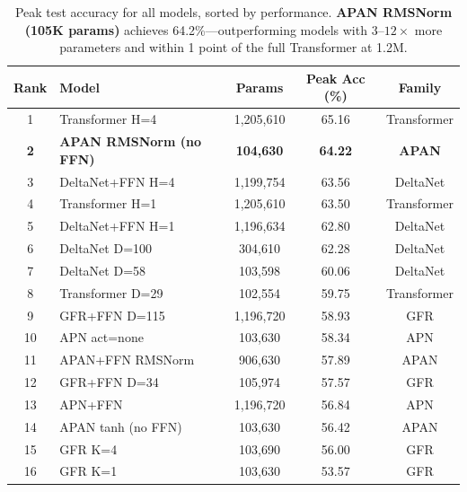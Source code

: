 \documentclass[11pt,a4paper]{article}
\begin{document}
\begin{table}[h]
\centering
\caption{Peak test accuracy for all models, sorted by performance. \textbf{APAN RMSNorm (105K params)} achieves 64.2\%---outperforming models with $3$--$12\times$ more parameters and within 1 point of the full Transformer at 1.2M.}
\label{tab:summary_ranked}
\begin{tabular}{clccc}
\toprule
\textbf{Rank} & \textbf{Model} & \textbf{Params} & \textbf{Peak Acc (\%)} & \textbf{Family} \\
\midrule
1 & Transformer H=4 & 1,205,610 & 65.16 & Transformer \\
\rowcolor{apan-rmsnorm!15}
\textbf{2} & \textbf{APAN RMSNorm (no FFN)} & \textbf{104,630} & \textbf{64.22} & \textbf{APAN} \\
3 & DeltaNet+FFN H=4 & 1,199,754 & 63.56 & DeltaNet \\
4 & Transformer H=1 & 1,205,610 & 63.50 & Transformer \\
5 & DeltaNet+FFN H=1 & 1,196,634 & 62.80 & DeltaNet \\
6 & DeltaNet D=100 & 304,610 & 62.28 & DeltaNet \\
7 & DeltaNet D=58 & 103,598 & 60.06 & DeltaNet \\
8 & Transformer D=29 & 102,554 & 59.75 & Transformer \\
9 & GFR+FFN D=115 & 1,196,720 & 58.93 & GFR \\
10 & APN act=none & 103,630 & 58.34 & APN \\
11 & APAN+FFN RMSNorm & 906,630 & 57.89 & APAN \\
12 & GFR+FFN D=34 & 105,974 & 57.57 & GFR \\
13 & APN+FFN & 1,196,720 & 56.84 & APN \\
14 & APAN tanh (no FFN) & 103,630 & 56.42 & APAN \\
15 & GFR K=4 & 103,690 & 56.00 & GFR \\
16 & GFR K=1 & 103,630 & 53.57 & GFR \\
\bottomrule
\end{tabular}
\end{table}
\end{document}
